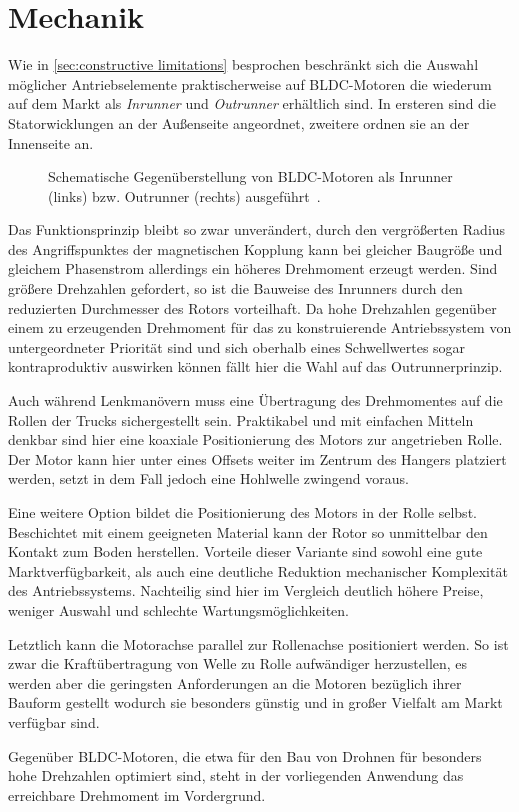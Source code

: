 \chapter{Mechanik}
	Wie in \cref{sec:constructive limitations} besprochen beschränkt sich die Auswahl möglicher Antriebselemente praktischerweise auf BLDC-Motoren die wiederum auf dem Markt als \textit{Inrunner} und \textit{Outrunner} erhältlich sind.
	In ersteren sind die Statorwicklungen an der Außenseite angeordnet, zweitere ordnen sie an der Innenseite an.
	\begin{figure}[h]
		\centering
		
		\caption[Gegenüberstellung von Inrunner und Outrunner]{Schematische Gegenüberstellung von BLDC-Motoren als Inrunner (links) bzw. Outrunner (rechts) ausgeführt~\cite{inrunner.outrunner.2022}.}
		\label{fig:inrunner outrunner}
	\end{figure}
	Das Funktionsprinzip bleibt so zwar unverändert, durch den vergrößerten Radius des Angriffspunktes der magnetischen Kopplung kann bei gleicher Baugröße und gleichem Phasenstrom allerdings ein höheres Drehmoment erzeugt werden.
	Sind größere Drehzahlen gefordert, so ist die Bauweise des Inrunners durch den reduzierten Durchmesser des Rotors vorteilhaft.
	Da hohe Drehzahlen gegenüber einem zu erzeugenden Drehmoment für das zu konstruierende Antriebssystem von untergeordneter Priorität sind und sich oberhalb eines Schwellwertes sogar kontraproduktiv auswirken können fällt hier die Wahl auf das Outrunnerprinzip.\par\medskip
	Auch während Lenkmanövern muss eine Übertragung des Drehmomentes auf die Rollen der Trucks sichergestellt sein.
	Praktikabel und mit einfachen Mitteln denkbar sind hier eine koaxiale Positionierung des Motors zur angetrieben Rolle.
	Der Motor kann hier unter eines Offsets weiter im Zentrum des Hangers platziert werden, setzt in dem Fall jedoch eine Hohlwelle zwingend voraus.\par
	Eine weitere Option bildet die Positionierung des Motors in der Rolle selbst.
	Beschichtet mit einem geeigneten Material kann der Rotor so unmittelbar den Kontakt zum Boden herstellen.
	Vorteile dieser Variante sind sowohl eine gute Marktverfügbarkeit, als auch eine deutliche Reduktion mechanischer Komplexität des Antriebssystems.
	Nachteilig sind hier im Vergleich deutlich höhere Preise, weniger Auswahl und schlechte Wartungsmöglichkeiten.\par
	Letztlich kann die Motorachse parallel zur Rollenachse positioniert werden.
	So ist zwar die Kraftübertragung von Welle zu Rolle aufwändiger herzustellen, es werden aber die geringsten Anforderungen an die Motoren bezüglich ihrer Bauform gestellt wodurch sie besonders günstig und in großer Vielfalt am Markt verfügbar sind.\par\medskip
	Gegenüber BLDC-Motoren, die etwa für den Bau von Drohnen für besonders hohe Drehzahlen optimiert sind, steht in der vorliegenden Anwendung das erreichbare Drehmoment im Vordergrund.
	
